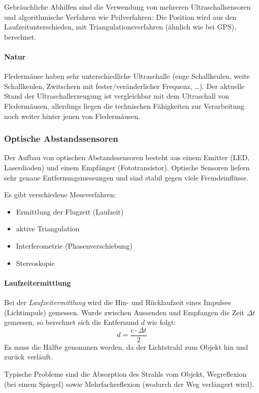 			Gebräuchliche Abhilfen sind die Verwendung von mehreren Ultraschallsensoren und algorithmische Verfahren wie Peilverfahren: Die Position wird aus den Laufzeitunterschieden, \zB mit Triangulationsverfahren (ähnlich wie bei GPS), berechnet.

		\paragraph{Natur}
			Fledermäuse haben sehr unterschiedliche Ultraschalle (enge Schallkeulen, weite Schallkeulen, Zwitschern mit fester/veränderlicher Frequenz, \dots). Der aktuelle Stand der Ultraschallerzeugung ist vergleichbar mit dem Ultraschall von Fledermäusen, allerdings liegen die technischen Fähigkeiten zur Verarbeitung noch weiter hinter jenen von Fledermäusen.

	\subsubsection{Optische Abstandssensoren}
		Der Aufbau von optischen Abstandssensoren besteht aus einem Emitter (LED, Laserdioden) und einem Empfänger (Fototransistor). Optische Sensoren liefern sehr genaue Entfernungsmessungen und sind stabil gegen viele Fremdeinflüsse.

		Es gibt verschiedene Messverfahren:
		\begin{itemize}
			\item Ermittlung der Flugzeit (Laufzeit)
			\item aktive Triangulation
			\item Interferometrie (Phasenverschiebung)
			\item Stereoskopie
		\end{itemize}

		\paragraph{Laufzeitermittlung}
			Bei der \emph{Laufzeitermittlung} wird die Hin- und Rücklaufzeit eines Impulses (\zB Lichtimpuls) gemessen. Wurde zwischen Aussenden und Empfangen die Zeit \( \Delta t \) gemessen, so berechnet sich die Entfernund \(d\) wie folgt:
			\begin{equation*}
				d = \frac{c \cdot \Delta t}{2}
			\end{equation*}
			Es muss die Hälfte genommen werden, da der Lichtstrahl zum Objekt hin und zurück verläuft.

			Typische Probleme sind die Absorption des Strahls vom Objekt, Wegreflexion (\zB bei einem Spiegel) sowie Mehrfachreflexion (wodurch der Weg verlängert wird).

